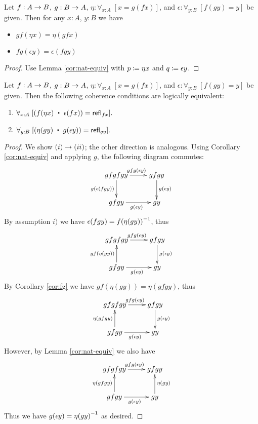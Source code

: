 \begin{cor}\label{cor:fg}
Let $f:A\rightarrow B$, $g:B\rightarrow A$, $\eta:\forall_{x:A}\; [x=g(fx)]$, and $\epsilon:\forall_{y:B}\; [f(gy)=y]$ be given. Then for any $x:A$, $y : B$ we have 
\begin{itemize}
\item $gf(\eta x) = \eta(gfx)$
\item $fg(\epsilon y) = \epsilon (fgy)$
\end{itemize}
\end{cor}
\begin{proof}
Use Lemma \ref{cor:nat-equiv} with $p \coloneqq \eta x$ and $q \coloneqq \epsilon y$.
\end{proof}

\begin{lem}\label{lem:coh-equiv}
Let $f:A\rightarrow B$, $g:B\rightarrow A$, $\eta:\forall_{x:A}\; [x=g(fx)]$, and $\epsilon:\forall_{y:B}\; [f(gy)=y]$ be given. Then the following coherence conditions are logically equivalent:
\begin{enumerate}
\item $\forall_{x:A}\;[(\map{f}{\eta x}\; \ct\;\epsilon(fx))=\refl{fx}].$
\item $\forall_{y:B}\;[(\eta(gy) \; \ct\;\map{g}{\epsilon y})=\refl{gy}].$
\end{enumerate}
\end{lem}
\begin{proof}
We show $(i)\rightarrow (ii)$; the other direction is analogous. Using Corollary \ref{cor:nat-equiv} and applying $g$, the following diagram commutes:
\[\uppercurveobject{{ }}\lowercurveobject{{ }}\twocellhead{{ }}
  \xymatrix{gfgfgy \ar^{gfg(\epsilon y)}[r] \ar_{g(\epsilon (fgy))}[d] & gfgy \ar^{g(\epsilon y)}[d] \\ gfgy \ar_{g(\epsilon y)}[r] & gy
  }\]
By assumption $i)$ we have $\epsilon (fgy) = \mathord{{f (\eta (gy))}^{-1}}$, thus
\[\uppercurveobject{{ }}\lowercurveobject{{ }}\twocellhead{{ }}
  \xymatrix{gfgfgy \ar^{gfg(\epsilon y)}[r] & gfgy \ar^{g(\epsilon y)}[d] \\ gfgy \ar_{g(\epsilon y)}[r] \ar^{gf(\eta (gy))}[u] & gy
  }\]
By Corollary \ref{cor:fg} we have $gf(\eta(gy)) = \eta(gfgy)$, thus
\[\uppercurveobject{{ }}\lowercurveobject{{ }}\twocellhead{{ }}
  \xymatrix{gfgfgy \ar^{gfg(\epsilon y)}[r] & gfgy \ar^{g(\epsilon y)}[d] \\ gfgy \ar_{g(\epsilon y)}[r] \ar^{\eta (gfgy)}[u] & gy
  }\]
However, by Lemma \ref{cor:nat-equiv} we also have
\[\uppercurveobject{{ }}\lowercurveobject{{ }}\twocellhead{{ }}
  \xymatrix{gfgfgy \ar^{gfg(\epsilon y)}[r] & gfgy  \\ gfgy \ar_{g(\epsilon y)}[r] \ar^{\eta (gfgy)}[u] & gy \ar_{\eta(gy)}[u]
  }\]
Thus we have $g(\epsilon y) = \mathord{{\eta(g y)}^{-1}}$ as desired.
\end{proof}

